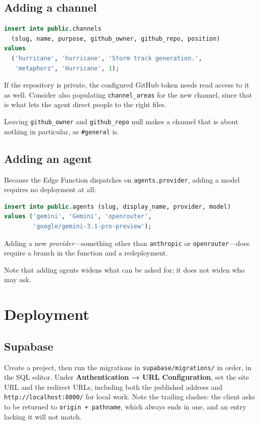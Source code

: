 \documentclass[11pt,letterpaper]{article}
\begin{document}
\subsection{Adding a channel}

\begin{lstlisting}[language=SQL]
insert into public.channels
  (slug, name, purpose, github_owner, github_repo, position)
values
  ('hurricane', 'hurricane', 'Storm track generation.',
   'metaphorz', 'Hurricane', 1);
\end{lstlisting}

If the repository is private, the configured GitHub token needs read access to
it as well. Consider also populating \texttt{channel\_areas} for the new
channel, since that is what lets the agent direct people to the right files.

Leaving \texttt{github\_owner} and \texttt{github\_repo} null makes a channel
that is about nothing in particular, as \texttt{\#general} is.

\subsection{Adding an agent}

Because the Edge Function dispatches on \texttt{agents.provider}, adding a model
requires no deployment at all:

\begin{lstlisting}[language=SQL]
insert into public.agents (slug, display_name, provider, model)
values ('gemini', 'Gemini', 'openrouter',
        'google/gemini-3.1-pro-preview');
\end{lstlisting}

Adding a new \emph{provider}---something other than \texttt{anthropic} or
\texttt{openrouter}---does require a branch in the function and a redeployment.

Note that adding agents widens what can be asked for; it does not widen who may
ask.

\section{Deployment}

\subsection{Supabase}

Create a project, then run the migrations in \texttt{supabase/migrations/} in
order, in the SQL editor. Under \textbf{Authentication → URL Configuration},
set the site URL and the redirect URLs, including both the published address and
\texttt{http://localhost:8000/} for local work. Note the trailing slashes: the
client asks to be returned to \texttt{origin + pathname}, which always ends in
one, and an entry lacking it will not match.
\end{document}
